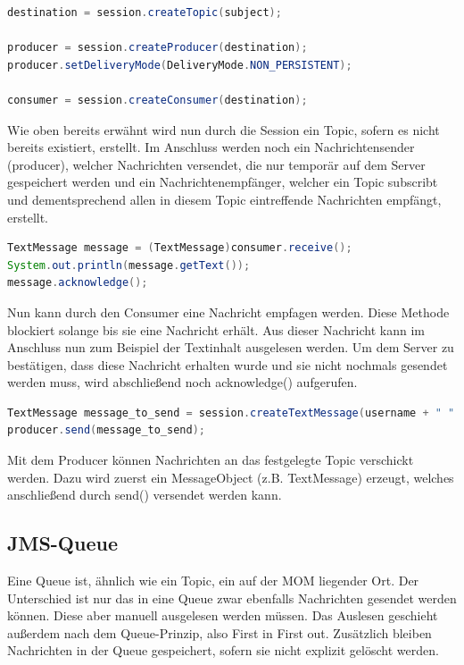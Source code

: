 \documentclass[11pt, a4paper]{article}
\begin{document}
\begin{lstlisting}[language=Java]
destination = session.createTopic(subject);

producer = session.createProducer(destination);
producer.setDeliveryMode(DeliveryMode.NON_PERSISTENT);
		
consumer = session.createConsumer(destination);
\end{lstlisting}

Wie oben bereits erwähnt wird nun durch die Session ein Topic, sofern es nicht bereits existiert, erstellt.
Im Anschluss werden noch ein Nachrichtensender (producer), welcher Nachrichten versendet, die nur temporär auf dem Server gespeichert werden und ein Nachrichtenempfänger,
welcher ein Topic subscribt und dementsprechend allen in diesem Topic eintreffende Nachrichten empfängt, erstellt.

\begin{lstlisting}[language=Java]
TextMessage message = (TextMessage)consumer.receive();
System.out.println(message.getText());
message.acknowledge();
\end{lstlisting}

Nun kann durch den Consumer eine Nachricht empfagen werden. Diese Methode blockiert solange bis sie eine Nachricht erhält. Aus dieser Nachricht kann im
Anschluss nun zum Beispiel der Textinhalt ausgelesen werden. Um dem Server zu bestätigen, dass diese Nachricht erhalten wurde und sie nicht nochmals gesendet
werden muss, wird abschließend noch acknowledge() aufgerufen.

\begin{lstlisting}[language=Java]
TextMessage message_to_send = session.createTextMessage(username + " " +  ip + ": " + message);
producer.send(message_to_send);
\end{lstlisting}

Mit dem Producer können Nachrichten an das festgelegte Topic verschickt werden. Dazu wird zuerst ein MessageObject (z.B. TextMessage) erzeugt, welches
anschließend durch send() versendet werden kann.

\subsection{JMS-Queue}
Eine Queue ist, ähnlich wie ein Topic, ein auf der MOM liegender Ort. Der Unterschied ist nur das in eine Queue zwar ebenfalls Nachrichten gesendet werden
können. Diese aber manuell ausgelesen werden müssen. Das Auslesen geschieht außerdem nach dem Queue-Prinzip, also First in First out. Zusätzlich bleiben
Nachrichten in der Queue gespeichert, sofern sie nicht explizit gelöscht werden.
\end{document}

